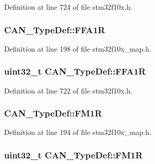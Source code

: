 Definition at line 724 of file stm32f10x.\+h.

\subsubsection[{\texorpdfstring{F\+F\+A1R}{FFA1R}}]{ C\+A\+N\+\_\+\+Type\+Def\+::\+F\+F\+A1R}\hypertarget{struct_c_a_n___type_def_a06681971d1f64c158e9a67868440458f}{}\label{struct_c_a_n___type_def_a06681971d1f64c158e9a67868440458f}


Definition at line 198 of file stm32f10x\+\_\+map.\+h.

\subsubsection[{\texorpdfstring{F\+F\+A1R}{FFA1R}}]{ {\bf uint32\+\_\+t} C\+A\+N\+\_\+\+Type\+Def\+::\+F\+F\+A1R}\hypertarget{struct_c_a_n___type_def_ae2decd14b26f851e00a31b42d15293ce}{}\label{struct_c_a_n___type_def_ae2decd14b26f851e00a31b42d15293ce}


Definition at line 722 of file stm32f10x.\+h.

\subsubsection[{\texorpdfstring{F\+M1R}{FM1R}}]{ C\+A\+N\+\_\+\+Type\+Def\+::\+F\+M1R}\hypertarget{struct_c_a_n___type_def_a613fdea10a52ee0afaa210f84dc1ebb9}{}\label{struct_c_a_n___type_def_a613fdea10a52ee0afaa210f84dc1ebb9}


Definition at line 194 of file stm32f10x\+\_\+map.\+h.

\subsubsection[{\texorpdfstring{F\+M1R}{FM1R}}]{ {\bf uint32\+\_\+t} C\+A\+N\+\_\+\+Type\+Def\+::\+F\+M1R}\hypertarget{struct_c_a_n___type_def_aefe6a26ee25947b7eb5be9d485f4d3b0}{}\label{struct_c_a_n___type_def_aefe6a26ee25947b7eb5be9d485f4d3b0}



